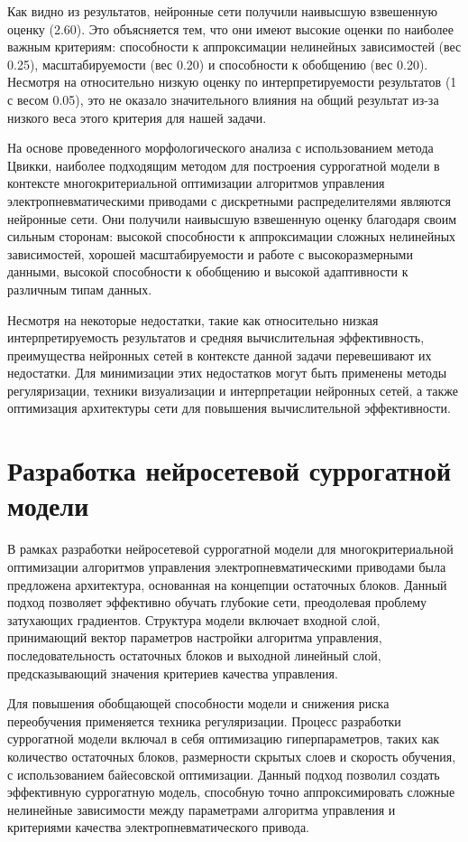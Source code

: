 Как видно из результатов, нейронные сети получили наивысшую взвешенную оценку
(2.60). Это объясняется тем, что они имеют высокие оценки по наиболее важным
критериям: способности к аппроксимации нелинейных зависимостей (вес 0.25),
масштабируемости (вес 0.20) и способности к обобщению (вес 0.20). Несмотря на
относительно низкую оценку по интерпретируемости результатов (1 с весом 0.05),
это не оказало значительного влияния на общий результат из-за низкого веса этого
критерия для нашей задачи.

На основе проведенного морфологического анализа с использованием метода
Цвикки, наиболее подходящим методом для построения суррогатной модели
в контексте многокритериальной оптимизации алгоритмов управления
электропневматическими приводами с дискретными распределителями
являются нейронные сети. Они получили наивысшую взвешенную оценку
благодаря своим сильным сторонам: высокой способности к аппроксимации
сложных нелинейных зависимостей, хорошей масштабируемости и работе с
высокоразмерными данными, высокой способности к обобщению и высокой
адаптивности к различным типам данных.

Несмотря на некоторые недостатки, такие как относительно низкая интерпретируемость
результатов и средняя вычислительная эффективность,
преимущества нейронных сетей в контексте данной задачи перевешивают
их недостатки. Для минимизации этих недостатков могут быть применены методы
регуляризации, техники визуализации и интерпретации нейронных сетей, а
также оптимизация архитектуры сети для повышения вычислительной эффективности.

\section{Разработка нейросетевой суррогатной модели}\label{sec:ch4/sec3}
В рамках разработки нейросетевой суррогатной модели для многокритериальной
оптимизации алгоритмов управления электропневматическими приводами была предложена
архитектура, основанная на концепции остаточных блоков. Данный подход позволяет
эффективно обучать глубокие сети, преодолевая проблему затухающих градиентов.
Структура модели включает входной слой, принимающий вектор параметров настройки
алгоритма управления, последовательность остаточных блоков и выходной линейный слой,
предсказывающий значения критериев качества управления.

Для повышения обобщающей способности модели и снижения
риска переобучения применяется техника регуляризации.
Процесс разработки суррогатной модели включал в себя оптимизацию
гиперпараметров, таких как количество остаточных блоков, размерности
скрытых слоев и скорость обучения, с использованием байесовской оптимизации.
Данный подход позволил создать эффективную суррогатную модель, способную
точно аппроксимировать сложные нелинейные зависимости между параметрами
алгоритма управления и критериями качества электропневматического привода.

